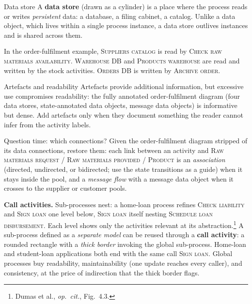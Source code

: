 \begin{definitionbox}{Data store}
A \textbf{data store} (drawn as a cylinder) is a place where the process reads or writes \emph{persistent} data: a database, a filing cabinet, a catalog. Unlike a data object, which lives within a single process instance, a data store outlives instances and is shared across them.
\end{definitionbox}

In the order-fulfilment example, \textsc{Suppliers catalog} is read by \textsc{Check raw materials availability}. \textsc{Warehouse DB} and \textsc{Products warehouse} are read and written by the stock activities. \textsc{Orders DB} is written by \textsc{Archive order}.

\begin{notebox}{Artefacts and readability}
Artefacts provide additional information, but excessive use compromises readability: the fully annotated order-fulfilment diagram (four data stores, state-annotated data objects, message data objects) is informative but dense. Add artefacts only when they document something the reader cannot infer from the activity labels.
\end{notebox}

\begin{examplebox}{Question time: which connections?}
Given the order-fulfilment diagram stripped of its data connections, restore them: each link between an activity and \textsc{Raw materials request} / \textsc{Raw materials provided} / \textsc{Product} is an \emph{association} (directed, undirected, or bidirected; use the state transitions as a guide) when it stays inside the pool, and a \emph{message flow} with a message data object when it crosses to the supplier or customer pools.
\end{examplebox}

\textbf{Call activities.} Sub-processes nest: a home-loan process refines \textsc{Check liability} and \textsc{Sign loan} one level below, \textsc{Sign loan} itself nesting \textsc{Schedule loan disbursement}. Each level shows only the activities relevant at its abstraction.\footnote{Dumas et al., \emph{op.~cit.}, Fig.~4.3.} A sub-process defined as a \emph{separate model} can be reused through a \textbf{call activity}: a rounded rectangle with a \emph{thick border} invoking the global sub-process. Home-loan and student-loan applications both end with the same call \textsc{Sign loan}. Global processes buy readability, maintainability (one update reaches every caller), and consistency, at the price of indirection that the thick border flags.

